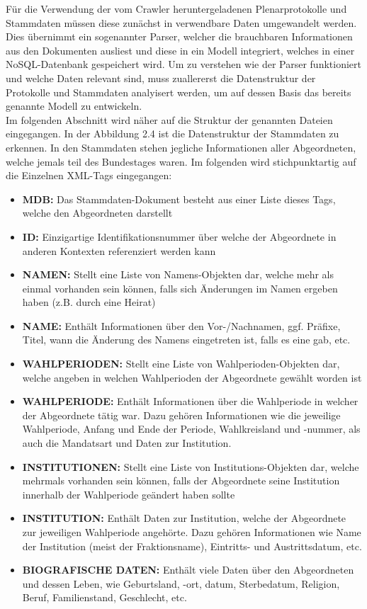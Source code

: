 Für die Verwendung der vom Crawler heruntergeladenen Plenarprotokolle und Stammdaten müssen diese zunächst in verwendbare Daten umgewandelt werden. Dies übernimmt ein sogenannter Parser, welcher die brauchbaren Informationen aus den Dokumenten ausliest und diese in ein Modell integriert, welches in einer NoSQL-Datenbank gespeichert wird. Um zu verstehen wie der Parser funktioniert und welche Daten relevant sind, muss zuallererst die Datenstruktur der Protokolle und Stammdaten analyisert werden, um auf dessen Basis das bereits genannte Modell zu entwickeln.
\\Im folgenden Abschnitt wird näher auf die Struktur der genannten Dateien eingegangen.
In der Abbildung 2.4 ist die Datenstruktur der Stammdaten zu erkennen. In den Stammdaten stehen jegliche Informationen aller Abgeordneten, welche jemals teil des Bundestages waren. Im folgenden wird stichpunktartig auf die Einzelnen XML-Tags eingegangen:
\begin{itemize}
    \item \textbf{MDB:}  Das Stammdaten-Dokument besteht aus einer Liste dieses Tags, welche den Abgeordneten darstellt
    \item \textbf{ID:} Einzigartige Identifikationsnummer über welche der Abgeordnete in anderen Kontexten referenziert werden kann
    \item  \textbf{NAMEN:} Stellt eine Liste von Namens-Objekten dar, welche mehr als einmal vorhanden sein können, falls sich Änderungen im Namen ergeben haben (z.B. durch eine Heirat)
    \item \textbf{NAME:} Enthält Informationen über den Vor-/Nachnamen, ggf. Präfixe, Titel, wann die Änderung des Namens eingetreten ist, falls es eine gab, etc.
    \item \textbf{WAHLPERIODEN:} Stellt eine Liste von Wahlperioden-Objekten dar, welche angeben in welchen Wahlperioden der Abgeordnete gewählt worden ist
    \item \textbf{WAHLPERIODE:} Enthält Informationen über die Wahlperiode in welcher der Abgeordnete tätig war. Dazu gehören Informationen wie die jeweilige Wahlperiode, Anfang und Ende der Periode, Wahlkreisland und -nummer, als auch die Mandatsart und Daten zur Institution.
    \item \textbf{INSTITUTIONEN:} Stellt eine Liste von Institutions-Objekten dar, welche mehrmals vorhanden sein können, falls der Abgeordnete seine Institution innerhalb der Wahlperiode geändert haben sollte
    \item \textbf{INSTITUTION:} Enthält Daten zur Institution, welche der Abgeordnete zur jeweiligen Wahlperiode angehörte. Dazu gehören Informationen wie Name der Institution (meist der Fraktionsname), Eintritts- und Austrittsdatum, etc.  
    \item \textbf{BIOGRAFISCHE DATEN:} Enthält viele Daten über den Abgeordneten und dessen Leben, wie Geburtsland, -ort, datum, Sterbedatum, Religion, Beruf, Familienstand, Geschlecht, etc.
\end{itemize}


